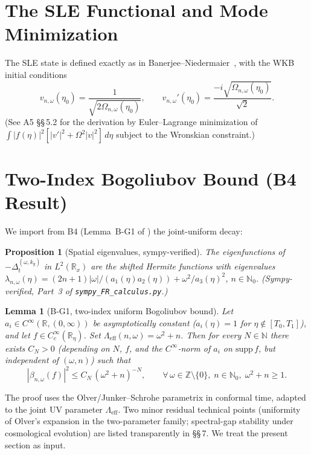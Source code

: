 \documentclass[11pt, a4paper]{article}
\newtheorem{proposition}[theorem]{Proposition}
\newtheorem{lemma}[theorem]{Lemma}
\newcommand{\RR}{\mathbb{R}}
\newcommand{\ZZ}{\mathbb{Z}}
\newcommand{\NN}{\mathbb{N}}
\newcommand{\lam}{\lambda}
\newcommand{\om}{\omega}
\newcommand{\Lam}{\Lambda}
\begin{document}
\section{The SLE Functional and Mode Minimization}

The SLE state is defined exactly as in Banerjee--Niedermaier~\cite{BN23},
with the WKB initial conditions
\begin{equation}\label{eq:WKB_IC}
  v_{n,\om}(\eta_0) = \frac{1}{\sqrt{2\Omega_{n,\om}(\eta_0)}},
  \qquad
  v_{n,\om}'(\eta_0) = \frac{-i\sqrt{\Omega_{n,\om}(\eta_0)}}{\sqrt{2}}.
\end{equation}
(See A5 \S\S\,5.2 for the derivation by Euler--Lagrange minimization of
$\int|f(\eta)|^2[|v'|^2+\Omega^2|v|^2]\,d\eta$ subject to the Wronskian
constraint.)

\section{Two-Index Bogoliubov Bound (B4 Result)}\label{sec:B4}

We import from B4 (Lemma~B-G1 of \cite{LemmaBG1}) the joint-uniform decay:

\begin{proposition}[Spatial eigenvalues, sympy-verified]\label{prop:eigenvalues_recall}
The eigenfunctions of $-\Delta_t^{(\om,k_y)}$ in $L^2(\RR_x)$ are the shifted
Hermite functions with eigenvalues
$\lam_{n,\om}(\eta) = (2n+1)|\om|/(a_1(\eta) a_2(\eta)) + \om^2/a_3(\eta)^2$,
$n\in\NN_0$. (Sympy-verified, Part~3 of \texttt{sympy\_FR\_calculus.py}.)
\end{proposition}

\begin{lemma}[B-G1, two-index uniform Bogoliubov bound]\label{lem:BG1}
Let $a_i \in C^\infty(\RR,(0,\infty))$ be asymptotically constant
($a_i(\eta)=1$ for $\eta\notin[T_0,T_1]$), and let $f\in C_c^\infty(\RR_\eta)$.
Set $\Lam_{\mathrm{eff}}(n,\om) = \om^2 + n$. Then for every $N\in\NN$ there
exists $C_N>0$ (depending on $N$, $f$, and the $C^\infty$-norm of $a_i$ on
$\mathrm{supp}\,f$, but \emph{independent} of $(\om,n)$) such that
\begin{equation}\label{eq:BG1}
  |\beta_{n,\om}(f)|^2 \le C_N\,(\om^2+n)^{-N},
  \qquad
  \forall\,\om\in\ZZ\setminus\{0\},\;n\in\NN_0,\;\om^2+n\ge1.
\end{equation}
\end{lemma}

The proof uses the Olver/Junker--Schrohe parametrix in conformal time, adapted
to the joint UV parameter $\Lam_{\mathrm{eff}}$. Two minor residual technical
points (uniformity of Olver's expansion in the two-parameter family;
spectral-gap stability under cosmological evolution) are listed transparently
in \cite{LemmaBG1} \S\S\,7. We treat the present section as input.
\end{document}
